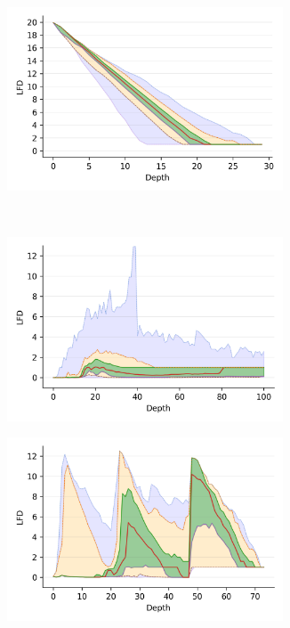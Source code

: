 \begin{figure}
\begin{subfigure}[b]{0.47\textwidth}
        \label{fig:results:sift-lfd}
    \end{subfigure}%
    \begin{subfigure}[b]{0.47\textwidth}
        \includegraphics[width=0.9\textwidth]{images/lfd/random.png}\\
        \label{fig:results:random-lfd}
    \end{subfigure}
    \\
    \begin{subfigure}[b]{0.47\textwidth}
        \includegraphics[width=0.9\textwidth]{images/lfd/silva-SSU-Ref.png}\\
        \label{fig:results:silva-lfd}
    \end{subfigure}%
    \begin{subfigure}[b]{0.47\textwidth}
        \includegraphics[width=0.9\textwidth]{images/lfd/radio-ml.png}\\

\end{subfigure}
\end{figure}

